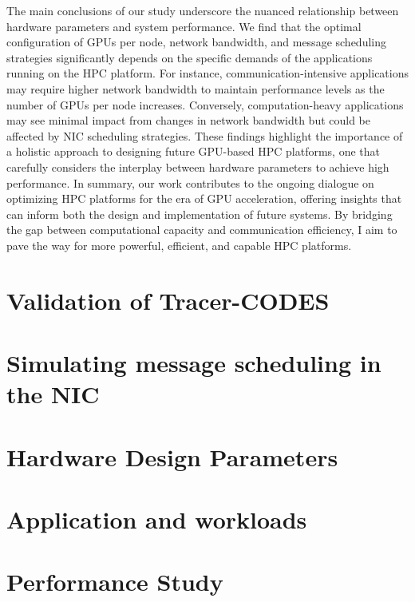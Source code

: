 The main conclusions of our study underscore the nuanced relationship between hardware parameters and system performance. We find that the optimal configuration of GPUs per node, network bandwidth, and message scheduling strategies significantly depends on the specific demands of the applications running on the HPC platform. For instance, communication-intensive applications may require higher network bandwidth to maintain performance levels as the number of GPUs per node increases. Conversely, computation-heavy applications may see minimal impact from changes in network bandwidth but could be affected by NIC scheduling strategies. These findings highlight the importance of a holistic approach to designing future GPU-based HPC platforms, one that carefully considers the interplay between hardware parameters to achieve high performance.
In summary, our work contributes to the ongoing dialogue on optimizing HPC platforms for the era of GPU acceleration, offering insights that can inform both the design and implementation of future systems. By bridging the gap between computational capacity and communication efficiency, I aim to pave the way for more powerful, efficient, and capable HPC platforms.

\section{Validation of Tracer-CODES}


\section{Simulating message scheduling in the NIC}


\section{Hardware Design Parameters}



\section{Application and workloads}


\section{Performance Study}


